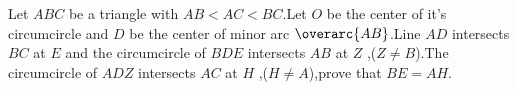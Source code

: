 Let $ABC$ be a triangle with $AB<AC<BC$.Let $O$ be the center of it's circumcircle and $D$ be the center
of minor arc $\overarc{AB}$.Line $AD$ intersects $BC$ at $E$ and the circumcircle of $BDE$ intersects $AB$ at
$Z$ ,($Z\not=B$).The circumcircle of $ADZ$ intersects $AC$ at $H$ ,($H\not=A$),prove that $BE=AH$.